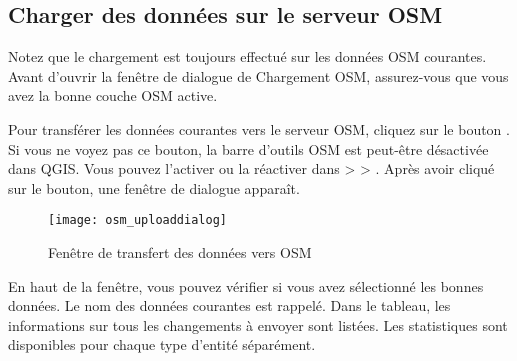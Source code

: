 \subsection{Charger des données sur le serveur OSM}  

Notez que le chargement est toujours effectué sur les données OSM courantes. Avant d'ouvrir la fenêtre de dialogue de Chargement OSM, assurez-vous que vous avez la bonne couche OSM active.

Pour transférer les données courantes vers le serveur OSM, cliquez sur le bouton . Si vous ne voyez pas ce bouton, la barre d'outils OSM est peut-être désactivée dans QGIS. Vous pouvez l'activer ou la réactiver dans  >  > . Après avoir cliqué sur le bouton, une fenêtre de dialogue apparaît.

\begin{figure}[ht]
   \centering
   \texttt{[image: osm\_uploaddialog]}
   \caption{Fenêtre de transfert des données vers OSM \nixcaption}\label{fig:osmupload}
\end{figure}

En haut de la fenêtre, vous pouvez vérifier si vous avez sélectionné les bonnes données. Le nom des données courantes est rappelé. Dans le tableau, les informations sur tous les changements à envoyer sont listées. Les statistiques sont disponibles pour chaque type d'entité séparément.

